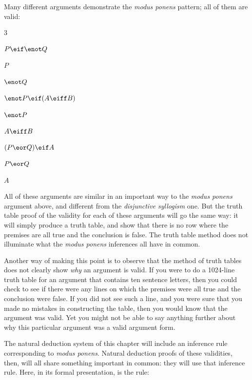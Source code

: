 Many different arguments demonstrate the \emph{modus ponens} pattern; all of them are valid:

\begin{multicols}{3}
\begin{earg}
\item[] $P \eif \enot Q$
\item[] $P$
\item[\therefore] $\enot Q$
\end{earg}

\begin{earg}
\item[] $\enot P \eif (A \eiff B)$
\item[] $\enot P$
\item[\therefore] $A \eiff B$
\end{earg}

\begin{earg}
\item[] $(P \eor Q) \eif A$
\item[] $P \eor Q$
\item[\therefore] $A$
\end{earg}

\end{multicols}

All of these arguments are similar in an important way to the \emph{modus ponens} argument above, and different from the \emph{disjunctive syllogism} one. But the truth table proof of the validity for each of these arguments will go the same way: it will simply produce a truth table, and show that there is no row where the premises are all true and the conclusion is false. The truth table method does not illuminate what the \emph{modus ponens} inferences all have in common.

Another way of making this point is to observe that the method of truth tables does not clearly show \emph{why} an argument is valid. If you were to do a 1024-line truth table for an argument that contains ten sentence letters, then you could check to see if there were any lines on which the premises were all true and the conclusion were false. If you did not see such a line, and you were sure that you made no mistakes in constructing the table, then you would know that the argument was valid. Yet you might not be able to say anything further about why this particular argument was a valid argument form.

The natural deduction system of this chapter will include an inference rule corresponding to \emph{modus ponens}. Natural deduction proofs of these validities, then, will all share something important in common: they will use that inference rule. Here, in its formal presentation, is the rule:

